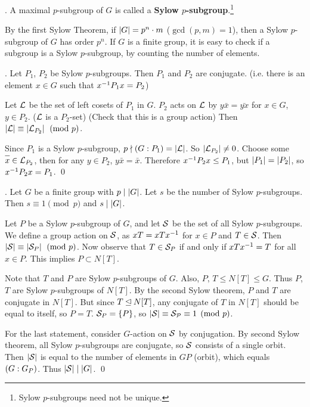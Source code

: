 \bigskip

.  A maximal \(p\)-subgroup of \(G\) is called a \textbf{Sylow \(p\)-subgroup}.\footnote{Sylow \(p\)-subgroups need not be unique.}

By the first Sylow Theorem, if \(\left| G \right| = p^n \cdot m\) (\(\gcd(p, m) = 1\)), then a Sylow \(p\)-subgroup of \(G\) has order \(p^n\). If \(G\) is a finite group, it is easy to check if a subgroup is a Sylow \(p\)-subgroup, by counting the number of elements.

\thm.  Let \(P_1\), \(P_2\) be Sylow \(p\)-subgroups. Then \(P_1\) and \(P_2\) are conjugate. (i.e. there is an element \(x \in G\) such that \(x^{-1} P_1 x = P_2\))

\pf Let \(\mathcal{L}\) be the set of left cosets of \(P_1\) in \(G\). \(P_2\) acts on \(\mathcal{L}\) by \(y \bar{x} = \bar{yx}\) for \(x \in G\), \(y \in P_2\). (\(\mathcal{L}\) is a \(P_2\)-set) (Check that this is a group action) Then \(\left| \mathcal{L} \right| \equiv \left| \mathcal{L}_{P_2} \right| \pmod p\).

Since \(P_1\) is a Sylow \(p\)-subgroup, \(p \nmid \left(G : P_1\right) = \left| \mathcal{L} \right|\). So \(\left| \mathcal{L}_{P_2} \right| \neq 0\). Choose some \(\bar{x} \in \mc{L}_{P_2}\), then for any \(y \in P_2\), \(y\bar{x} = \bar{x}\). Therefore \(x^{-1} P_2 x \leq P_1\), but \(\left| P_1 \right| = \left| P_2 \right|\), so \(x^{-1} P_2 x = P_1\). \qed

\bigskip

\thm.  Let \(G\) be a finite group with \(p \mid \left| G \right|\). Let \(s\) be the number of Sylow \(p\)-sub\-groups. Then \(s \equiv 1 \pmod p\) and \(s \mid \left| G \right|\).

\pf Let \(P\) be a Sylow \(p\)-subgroup of \(G\), and let \(\mathcal{S}\) be the set of all Sylow \(p\)-subgroups. We define a group action on \(\mathcal{S}\), as \(xT = xTx^{-1}\) for \(x \in P\) and \(T \in \mathcal{S}\). Then \(\left| \mathcal{S} \right| \equiv \left| \mathcal{S}_P \right| \pmod p\). Now observe that \(T \in \mathcal{S}_P\) if and only if \(xTx^{-1} = T\) for all \(x \in P\). This implies \(P \subset N[T]\).

Note that \(T\) and \(P\) are Sylow \(p\)-subgroups of \(G\). Also, \(P,\, T \leq N[T] \leq G\). Thus \(P\), \(T\) are Sylow \(p\)-subgroups of \(N[T]\). By the second Sylow theorem, \(P\) and \(T\) are conjugate in \(N[T]\). But since \(T \unlhd N[T]\), any conjugate of \(T\) in \(N[T]\) should be equal to itself, so \(P = T\). \(\mathcal{S}_P = \{P\}\), so \(\left| \mathcal{S} \right| \equiv \mathcal{\mathcal{S}_P} \equiv 1 \pmod p\).

For the last statement, consider \(G\)-action on \(\mathcal{S}\) by conjugation. By second Sylow theorem, all Sylow \(p\)-subgroups are conjugate, so \(\mathcal{S}\) consists of a single orbit. Then \(\left| \mathcal{S} \right|\) is equal to the number of elements in \(GP\) (orbit), which equals \(\left(G : G_P\right)\). Thus \(\left| \mathcal{S} \right| \mid \left| G \right|\). \qed

